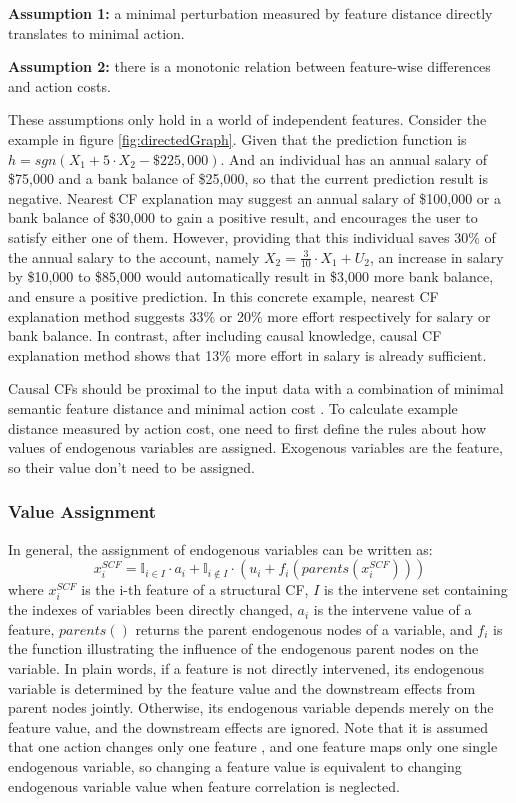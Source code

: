 \noindent \textbf{Assumption 1:} a minimal perturbation measured by feature distance directly translates to minimal action.

\noindent \textbf{Assumption 2:} there is a monotonic relation between feature-wise differences and action costs.

These assumptions only hold in a world of independent features. Consider the example in figure \ref{fig:directedGraph}. Given that the prediction function is $h=sgn(X_1+5\cdot X_2-\$225,000)$. And an individual has an annual salary of \$75,000 and a bank balance of \$25,000, so that the current prediction result is negative. Nearest CF explanation may suggest an annual salary of \$100,000 or a bank balance of \$30,000 to gain a positive result, and encourages the user to satisfy either one of them. However, providing that this individual saves 30\% of the annual salary to the account, namely $X_2=\frac{3}{10}\cdot X_1+U_2$, an increase in salary by \$10,000 to \$85,000 would automatically result in \$3,000 more bank balance, and ensure a positive prediction. In this concrete example, nearest CF explanation method suggests 33\% or 20\% more effort respectively for salary or bank balance. In contrast, after including causal knowledge, causal CF explanation method shows that 13\% more effort in salary is already sufficient.

Causal CFs should be proximal to the input data with a combination of minimal semantic feature distance and minimal action cost \cite{algorithmicrecourse,preservingCausal}. To calculate example distance measured by action cost, one need to first define the rules about how values of endogenous variables are assigned. Exogenous variables are the feature, so their value don't need to be assigned.
\subsubsection{Value Assignment} In general, the assignment of endogenous variables can be written as:
\begin{equation}\label{eq:SCM}
  x_i^{SCF}=\mathbb{I}_{i\in I}\cdot a_i+\mathbb{I}_{i\notin I}\cdot(u_i+f_i(parents(x_i^{SCF})))
\end{equation}
where $x_i^{SCF}$ is the i-th feature of a structural CF, $I$ is the intervene set containing the indexes of variables been directly changed, $a_i$ is the intervene value of a feature, $parents()$ returns the parent endogenous nodes of a variable, and $f_i$ is the function illustrating the influence of the endogenous parent nodes on the variable. In plain words, if a feature is not directly intervened, its endogenous variable is determined by the feature value and the downstream effects from parent nodes jointly. Otherwise, its endogenous variable depends merely on the feature value, and the downstream effects are ignored. Note that it is assumed that one action changes only one feature \cite{algorithmicrecourse}, and one feature maps only one single endogenous variable, so changing a feature value is equivalent to changing endogenous variable value when feature correlation is neglected.

